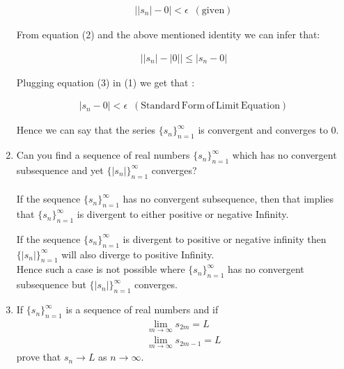 \documentclass[11pt, letterpaper]{article}
\begin{document}
\begin{enumerate}
{	\begin{eqnarray}
		\left| \left| s_n \right| - 0 \right| < \epsilon \,\,\, (\mathrm{given})
	\end{eqnarray}
	
	From equation (2) and the above mentioned identity we can infer that:
	
	\begin{eqnarray}
		\left| \left| s_n \right| - \left|0 \right| \right| \leq \left| s_n - 0\right| 
	\end{eqnarray}
	
	Plugging equation (3) in (1) we get that :
	
	\begin{eqnarray}
		\left| s_n - 0 \right| < \epsilon \,\,\, (\mathrm{Standard\, Form\, of\, Limit\, Equation})
	\end{eqnarray}
	
	Hence we can say that the series $ \lbrace s_n \rbrace_{n=1}^\infty $ is convergent and converges to 0.
}

\clearpage

\item{Can you find a sequence of real numbers $\lbrace s_n \rbrace_{n=1}^\infty$ which has no convergent subsequence and yet $\lbrace\left| s_n \right|\rbrace_{n=1}^\infty$ converges?\\\\
	If the sequence $ \lbrace s_n \rbrace_{n=1}^\infty $ has no convergent subsequence, then that implies that $ \lbrace s_n \rbrace_{n=1}^\infty $ is divergent to either positive or negative Infinity.
	
	If the sequence $ \lbrace s_n \rbrace_{n=1}^\infty $ is divergent to positive or negative infinity then $ \lbrace \left| s_n \right| \rbrace_{n=1}^\infty $ will also diverge to positive Infinity. \\
	Hence such a case is not possible where $ \lbrace s_n \rbrace_{n=1}^\infty $ has no convergent subsequence but $ \lbrace \left| s_n \right| \rbrace_{n=1}^\infty $ converges.
}

\item{If $\lbrace s_n \rbrace_{n=1}^\infty$ is a sequence of real numbers and if
	\begin{align*}
		\lim \limits_{m \to \infty} s_{2m} = L\\
		\lim \limits_{m \to \infty} s_{2m-1} = L
	\end{align*}
	prove that $s_n \to L $ as $n \to \infty$.\\
	
}
\end{enumerate}
\end{document}
